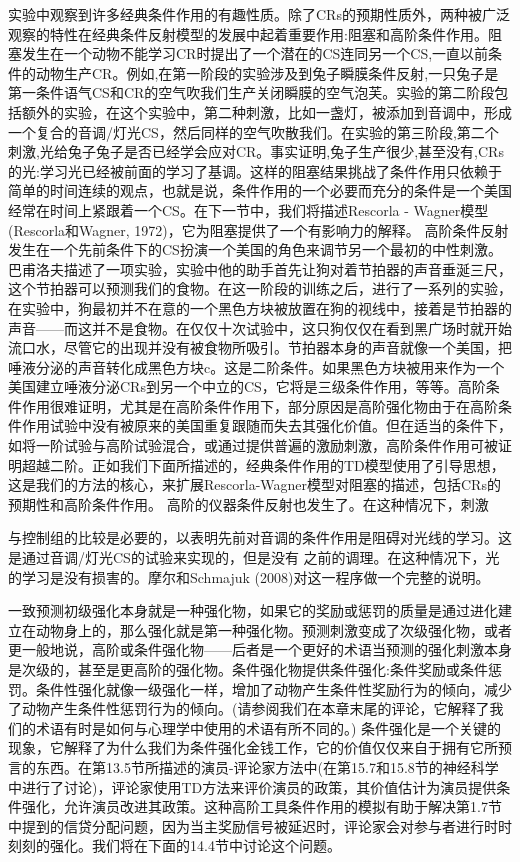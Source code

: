实验中观察到许多经典条件作用的有趣性质。除了CRs的预期性质外，两种被广泛观察的特性在经典条件反射模型的发展中起着重要作用:阻塞和高阶条件作用。阻塞发生在一个动物不能学习CR时提出了一个潜在的CS连同另一个CS,一直以前条件的动物生产CR。例如,在第一阶段的实验涉及到兔子瞬膜条件反射,一只兔子是第一条件语气CS和CR的空气吹我们生产关闭瞬膜的空气泡芙。实验的第二阶段包括额外的实验，在这个实验中，第二种刺激，比如一盏灯，被添加到音调中，形成一个复合的音调/灯光CS，然后同样的空气吹散我们。在实验的第三阶段,第二个刺激,光给兔子兔子是否已经学会应对CR。事实证明,兔子生产很少,甚至没有,CRs的光:学习光已经被前面的学习了基调。这样的阻塞结果挑战了条件作用只依赖于简单的时间连续的观点，也就是说，条件作用的一个必要而充分的条件是一个美国经常在时间上紧跟着一个CS。在下一节中，我们将描述Rescorla - Wagner模型(Rescorla和Wagner, 1972)，它为阻塞提供了一个有影响力的解释。
高阶条件反射发生在一个先前条件下的CS扮演一个美国的角色来调节另一个最初的中性刺激。巴甫洛夫描述了一项实验，实验中他的助手首先让狗对着节拍器的声音垂涎三尺，这个节拍器可以预测我们的食物。在这一阶段的训练之后，进行了一系列的实验，在实验中，狗最初并不在意的一个黑色方块被放置在狗的视线中，接着是节拍器的声音——而这并不是食物。在仅仅十次试验中，这只狗仅仅在看到黑广场时就开始流口水，尽管它的出现并没有被食物所吸引。节拍器本身的声音就像一个美国，把唾液分泌的声音转化成黑色方块c。这是二阶条件。如果黑色方块被用来作为一个美国建立唾液分泌CRs到另一个中立的CS，它将是三级条件作用，等等。高阶条件作用很难证明，尤其是在高阶条件作用下，部分原因是高阶强化物由于在高阶条件作用试验中没有被原来的美国重复跟随而失去其强化价值。但在适当的条件下，如将一阶试验与高阶试验混合，或通过提供普遍的激励刺激，高阶条件作用可被证明超越二阶。正如我们下面所描述的，经典条件作用的TD模型使用了引导思想，这是我们的方法的核心，来扩展Rescorla-Wagner模型对阻塞的描述，包括CRs的预期性和高阶条件作用。
高阶的仪器条件反射也发生了。在这种情况下，刺激

与控制组的比较是必要的，以表明先前对音调的条件作用是阻碍对光线的学习。这是通过音调/灯光CS的试验来实现的，但是没有
之前的调理。在这种情况下，光的学习是没有损害的。摩尔和Schmajuk
(2008)对这一程序做一个完整的说明。

一致预测初级强化本身就是一种强化物，如果它的奖励或惩罚的质量是通过进化建立在动物身上的，那么强化就是第一种强化物。预测刺激变成了次级强化物，或者更一般地说，高阶或条件强化物——后者是一个更好的术语当预测的强化刺激本身是次级的，甚至是更高阶的强化物。条件强化物提供条件强化:条件奖励或条件惩罚。条件性强化就像一级强化一样，增加了动物产生条件性奖励行为的倾向，减少了动物产生条件性惩罚行为的倾向。(请参阅我们在本章末尾的评论，它解释了我们的术语有时是如何与心理学中使用的术语有所不同的。)
条件强化是一个关键的现象，它解释了为什么我们为条件强化金钱工作，它的价值仅仅来自于拥有它所预言的东西。在第13.5节所描述的演员-评论家方法中(在第15.7和15.8节的神经科学中进行了讨论)，评论家使用TD方法来评价演员的政策，其价值估计为演员提供条件强化，允许演员改进其政策。这种高阶工具条件作用的模拟有助于解决第1.7节中提到的信贷分配问题，因为当主奖励信号被延迟时，评论家会对参与者进行时时刻刻的强化。我们将在下面的14.4节中讨论这个问题。

